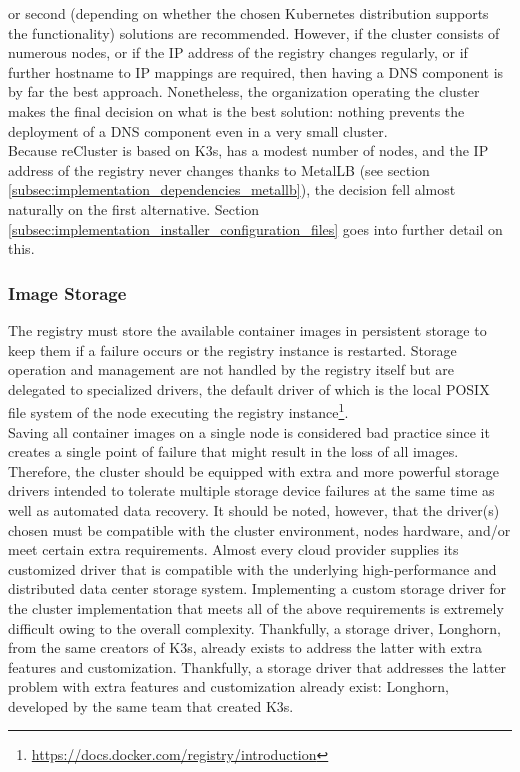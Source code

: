 or second (depending on whether the chosen Kubernetes distribution supports the
functionality) solutions are recommended. However, if the cluster consists of numerous
nodes, or if the IP address of the registry changes regularly, or if further hostname
to IP mappings are required, then having a DNS component is by far the best
approach. Nonetheless, the organization operating the cluster makes the final
decision on what is the best solution: nothing prevents the deployment of a DNS component
even in a very small cluster. \\ %
Because reCluster is based on K3s, has a modest number of nodes, and the IP address
of the registry never changes thanks to MetalLB (see section
\ref{subsec:implementation_dependencies_metallb}), the decision fell almost
naturally on the first alternative. Section \ref{subsec:implementation_installer_configuration_files}
goes into further detail on this.

\subsubsection{Image Storage}
\label{subsubsec:implementation_dependencies_docker_registry_image_storage}

The registry must store the available container images in persistent storage to
keep them if a failure occurs or the registry instance is restarted. Storage operation
and management are not handled by the registry itself but are delegated to specialized
drivers, the default driver of which is the local POSIX file system of the node
executing the registry instance\footnote{\url{https://docs.docker.com/registry/introduction}}.
\\ %
Saving all container images on a single node is considered bad practice since it
creates a single point of failure that might result in the loss of all images. Therefore,
the cluster should be equipped with extra and more powerful storage drivers
intended to tolerate multiple storage device failures at the same time as well
as automated data recovery. It should be noted, however, that the driver(s)
chosen must be compatible with the cluster environment, nodes hardware, and/or
meet certain extra requirements. Almost every cloud provider supplies its customized
driver that is compatible with the underlying high-performance and distributed data
center storage system. Implementing a custom storage driver for the cluster
implementation that meets all of the above requirements is extremely difficult
owing to the overall complexity. Thankfully, a storage driver, Longhorn, from
the same creators of K3s, already exists to address the latter with extra features
and customization. Thankfully, a storage driver that addresses the latter problem
with extra features and customization already exist: Longhorn, developed by the same
team that created K3s.

